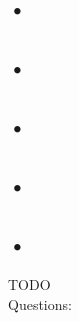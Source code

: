 \documentclass[a4]{scrartcl}
\begin{document}
\subsection*{•}

\subsection*{•}

\subsection*{•}

\subsection*{•}

\subsection*{•}

\color{red} TODO \\
\color{black}
\color{violet} Questions:
\color{black}


\newpage

\printbibliography
\end{document}
